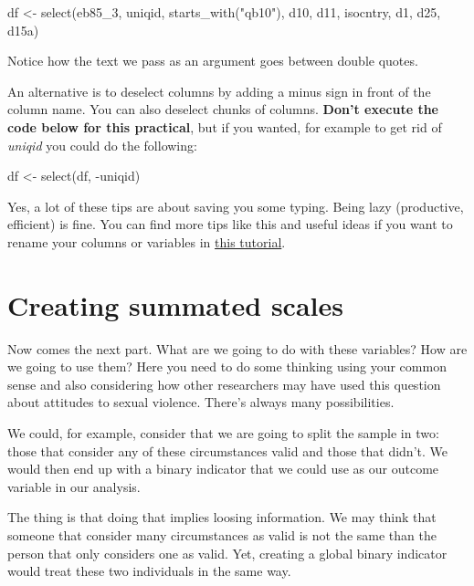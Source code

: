 \documentclass[
]{book}
\newenvironment{Shaded}{\begin{snugshade}}{\end{snugshade}}
\newcommand{\FunctionTok}[1]{\textcolor[rgb]{0.00,0.00,0.00}{#1}}
\newcommand{\NormalTok}[1]{#1}
\newcommand{\OtherTok}[1]{\textcolor[rgb]{0.56,0.35,0.01}{#1}}
\newcommand{\SpecialCharTok}[1]{\textcolor[rgb]{0.00,0.00,0.00}{#1}}
\newcommand{\StringTok}[1]{\textcolor[rgb]{0.31,0.60,0.02}{#1}}
\begin{document}
\begin{Shaded}
\begin{Highlighting}[]
\NormalTok{df }\OtherTok{\textless{}{-}} \FunctionTok{select}\NormalTok{(eb85\_3, uniqid, }\FunctionTok{starts\_with}\NormalTok{(}\StringTok{"qb10"}\NormalTok{), d10, d11,}
\NormalTok{             isocntry, d1, d25, d15a)}
\end{Highlighting}
\end{Shaded}

Notice how the text we pass as an argument goes between double quotes.

An alternative is to deselect columns by adding a minus sign in front of the column name. You can also deselect chunks of columns. \textbf{Don't execute the code below for this practical}, but if you wanted, for example to get rid of \emph{uniqid} you could do the following:

\begin{Shaded}
\begin{Highlighting}[]
\NormalTok{df }\OtherTok{\textless{}{-}} \FunctionTok{select}\NormalTok{(df, }\SpecialCharTok{{-}}\NormalTok{uniqid)}
\end{Highlighting}
\end{Shaded}

Yes, a lot of these tips are about saving you some typing. Being lazy (productive, efficient) is fine. You can find more tips like this and useful ideas if you want to rename your columns or variables in \href{https://suzan.rbind.io/2018/01/dplyr-tutorial-1/}{this tutorial}.

\hypertarget{creating-summated-scales}{%
\section{Creating summated scales}\label{creating-summated-scales}}

Now comes the next part. What are we going to do with these variables? How are we going to use them? Here you need to do some thinking using your common sense and also considering how other researchers may have used this question about attitudes to sexual violence. There's always many possibilities.

We could, for example, consider that we are going to split the sample in two: those that consider any of these circumstances valid and those that didn't. We would then end up with a binary indicator that we could use as our outcome variable in our analysis.

The thing is that doing that implies loosing information. We may think that someone that consider many circumstances as valid is not the same than the person that only considers one as valid. Yet, creating a global binary indicator would treat these two individuals in the same way.
\end{document}
